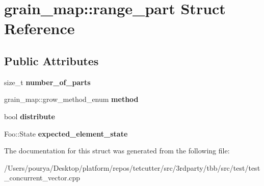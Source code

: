 \hypertarget{structgrain__map_1_1range__part}{}\section{grain\+\_\+map\+:\+:range\+\_\+part Struct Reference}
\label{structgrain__map_1_1range__part}
\subsection*{Public Attributes}
\begin{DoxyCompactItemize}
\item 
\hypertarget{structgrain__map_1_1range__part_abaacfd075f098f91233b2384d4580b93}{}size\+\_\+t {\bfseries number\+\_\+of\+\_\+parts}\label{structgrain__map_1_1range__part_abaacfd075f098f91233b2384d4580b93}

\item 
\hypertarget{structgrain__map_1_1range__part_a18e56ca5d5f2e30af4f17805745aab65}{}grain\+\_\+map\+::grow\+\_\+method\+\_\+enum {\bfseries method}\label{structgrain__map_1_1range__part_a18e56ca5d5f2e30af4f17805745aab65}

\item 
\hypertarget{structgrain__map_1_1range__part_a6f53bf0ead1e75779fe4c7e2f0a96311}{}bool {\bfseries distribute}\label{structgrain__map_1_1range__part_a6f53bf0ead1e75779fe4c7e2f0a96311}

\item 
\hypertarget{structgrain__map_1_1range__part_a958a24256644140ea6a5bfa705d95aa5}{}Foo\+::\+State {\bfseries expected\+\_\+element\+\_\+state}\label{structgrain__map_1_1range__part_a958a24256644140ea6a5bfa705d95aa5}

\end{DoxyCompactItemize}


The documentation for this struct was generated from the following file\+:\begin{DoxyCompactItemize}
\item 
/\+Users/pourya/\+Desktop/platform/repos/tetcutter/src/3rdparty/tbb/src/test/test\+\_\+concurrent\+\_\+vector.\+cpp\end{DoxyCompactItemize}
